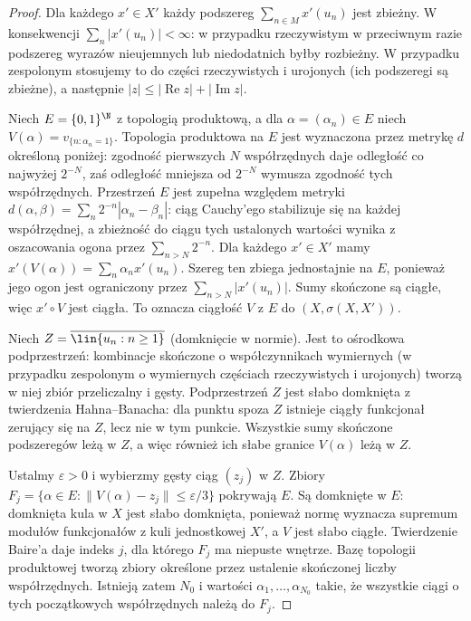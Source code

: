 \begin{proof}
Dla każdego $x'\in X'$ każdy podszereg
$\sum_{n\in M}x'(u_n)$ jest zbieżny. W konsekwencji
$\sum_n|x'(u_n)|<\infty$: w przypadku rzeczywistym
w przeciwnym razie podszereg wyrazów nieujemnych
lub niedodatnich byłby rozbieżny. W przypadku zespolonym
stosujemy to do części rzeczywistych i urojonych
(ich podszeregi są zbieżne), a następnie
$|z|\le|\operatorname{Re}z|+|\operatorname{Im}z|$.

Niech $E=\{0,1\}^{\N}$ z topologią produktową, a dla
$\alpha=(\alpha_n)\in E$ niech
$V(\alpha)=v_{\{n:\alpha_n=1\}}$. Topologia produktowa na $E$ jest wyznaczona przez metrykę
$d$ określoną poniżej: zgodność pierwszych $N$ współrzędnych
daje odległość co najwyżej $2^{-N}$, zaś odległość mniejsza
od $2^{-N}$ wymusza zgodność tych współrzędnych.
Przestrzeń $E$ jest zupełna względem metryki
$d(\alpha,\beta)=\sum_n2^{-n}|\alpha_n-\beta_n|$:
ciąg Cauchy'ego stabilizuje się na każdej współrzędnej,
a zbieżność do ciągu tych ustalonych wartości wynika
z oszacowania ogona przez $\sum_{n>N}2^{-n}$.
Dla każdego $x'\in X'$ mamy
$x'(V(\alpha))=\sum_n\alpha_n x'(u_n)$. Szereg ten
zbiega jednostajnie na $E$, ponieważ jego ogon jest
ograniczony przez $\sum_{n>N}|x'(u_n)|$.
Sumy skończone są ciągłe, więc $x'\circ V$ jest ciągła.
To oznacza ciągłość $V$ z $E$ do $(X,\sigma(X,X'))$.

Niech $Z=\overline{\lin\{u_n:n\ge1\}}$ (domknięcie w normie).
Jest to ośrodkowa podprzestrzeń: kombinacje skończone
o współczynnikach wymiernych (w przypadku zespolonym
o wymiernych częściach rzeczywistych i urojonych)
tworzą w niej zbiór przeliczalny i gęsty. Podprzestrzeń
$Z$ jest słabo domknięta z twierdzenia Hahna--Banacha:
dla punktu spoza $Z$ istnieje ciągły funkcjonał zerujący
się na $Z$, lecz nie w tym punkcie. Wszystkie sumy
skończone podszeregów leżą w $Z$, a więc również ich
słabe granice $V(\alpha)$ leżą w $Z$.

Ustalmy $\varepsilon>0$ i wybierzmy gęsty ciąg $(z_j)$
w $Z$. Zbiory
$F_j=\{\alpha\in E:\|V(\alpha)-z_j\|\le\varepsilon/3\}$
pokrywają $E$. Są domknięte w $E$: domknięta kula
w $X$ jest słabo domknięta, ponieważ normę wyznacza
supremum modułów funkcjonałów z kuli jednostkowej $X'$,
a $V$ jest słabo ciągłe. Twierdzenie Baire'a daje indeks
$j$, dla którego $F_j$ ma niepuste wnętrze.
Bazę topologii produktowej tworzą zbiory określone przez
ustalenie skończonej liczby współrzędnych. Istnieją zatem
$N_0$ i wartości $\alpha_1,\ldots,\alpha_{N_0}$ takie,
że wszystkie ciągi o tych początkowych współrzędnych
należą do $F_j$.


\end{proof}
